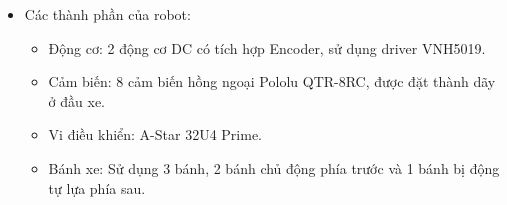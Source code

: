 \begin{itemize}
        \item Các thành phần của robot:
            \begin{itemize}[label=\textendash]
                \item Động cơ: 2 động cơ DC có tích hợp Encoder, sử dụng driver VNH5019.
                \item Cảm biến: 8 cảm biến hồng ngoại Pololu QTR-8RC, được đặt thành dãy ở đầu xe.
                \item Vi điều khiển: A-Star 32U4 Prime.
                \item Bánh xe: Sử dụng 3 bánh, 2 bánh chủ động phía trước và 1 bánh bị động tự lựa phía sau.
            \end{itemize}
    \end{itemize}



